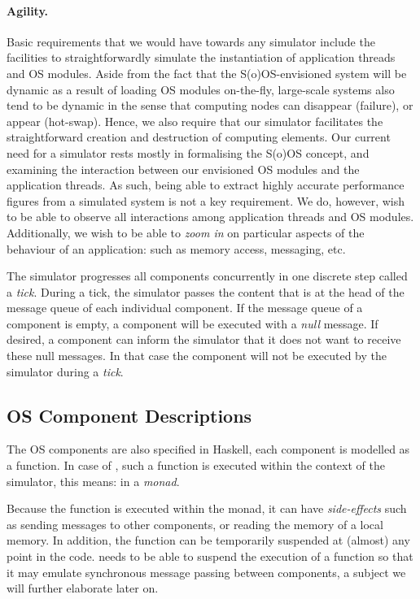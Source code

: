 \paragraph{Agility.}
Basic requirements that we would have towards any simulator include the facilities to straightforwardly simulate the instantiation of application threads and OS modules.
Aside from the fact that the S(o)OS-envisioned system will be dynamic as a result of loading OS modules on-the-fly, large-scale systems also tend to be dynamic in the sense that computing nodes can disappear (failure), or
appear (hot-swap).
Hence, we also require that our simulator facilitates the straightforward creation and destruction of computing elements.
Our current need for a simulator rests mostly in formalising the S(o)OS concept, and examining the interaction between our envisioned OS modules and the application threads.
As such, being able to extract highly accurate performance figures from a simulated system is not a key requirement.
We do, however, wish to be able to observe all interactions among application threads and OS modules.
Additionally, we wish to be able to \emph{zoom in} on particular aspects of the behaviour of an application: such as memory access, messaging, etc.

The simulator progresses all components concurrently in one discrete step called a \emph{tick}.
During a tick, the simulator passes the content that is at the head of the message queue of each individual component.
If the message queue of a component is empty, a component will be executed with a \emph{null} message.
If desired, a component can inform the simulator that it does not want to receive these null messages.
In that case the component will not be executed by the simulator during a \emph{tick}.


\subsection{OS Component Descriptions}

The OS components are also specified in Haskell, each component is modelled as a function.
In case of \soosim, such a function is executed within the context of the simulator, this means: in a \emph{monad}.

Because the function is executed within the monad, it can have \emph{side-effects} such as sending messages to other components, or reading the memory of a local memory.
In addition, the function can be temporarily suspended at (almost) any point in the code.
\soosim needs to be able to suspend the execution of a function so that it may emulate synchronous message passing between components, a subject we will further elaborate later on.

